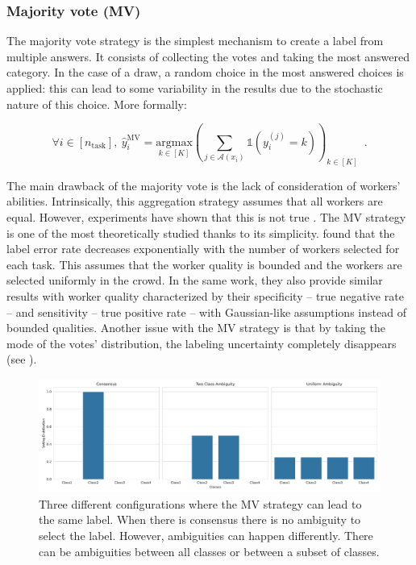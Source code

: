 \subsubsection{Majority vote (MV)}
\label{subsub:mv}

The majority vote strategy is the simplest mechanism to create a label from multiple answers.
It consists of collecting the votes and taking the most answered category.
In the case of a draw, a random choice in the most answered choices is applied: this can lead to some variability in the results due to the stochastic nature of this choice.
More formally:

\begin{equation}\label{eq:mv}
    \forall i\in [n_\text{task}],\ \hat y_i^{\mathrm{MV}} = \underset{k\in[K]}{\mathrm{argmax}}\left(\sum_{j\in\mathcal{A}(x_i)} \mathds{1}(y_i^{(j)}=k)\right)_{k\in[K]} \enspace.
\end{equation}

The main drawback of the majority vote is the lack of consideration of workers' abilities.
Intrinsically, this aggregation strategy assumes that all workers are equal.
However, experiments have shown that this is not true \citep{snow_cheap_2008,vuurens2011much}.
The MV strategy is one of the most theoretically studied thanks to its simplicity.
\citet{wang2015crowdsourcing} found that the label error rate decreases exponentially with the number of workers selected for each task. This assumes that the worker quality is bounded and the workers are selected uniformly in the crowd.
In the same work, they also provide similar results with worker quality characterized by their specificity -- true negative rate -- and sensitivity -- true positive rate -- with Gaussian-like assumptions instead of bounded qualities.
Another issue with the MV strategy is that by taking the mode of the votes' distribution, the labeling uncertainty completely disappears (see ).

\begin{figure}[htb]
    \centering
    \includegraphics[width=.96\textwidth]{chapters/images/ambiguity.pdf}
    \caption{Three different configurations where the MV strategy can lead to the same label. When there is consensus there is no ambiguity to select the label. However, ambiguities can happen differently. There can be ambiguities between all classes or between a subset of classes.}
    \label{fig:confusion-types}
\end{figure}

